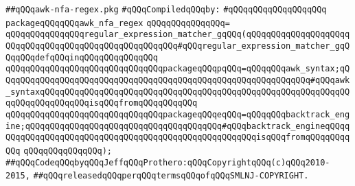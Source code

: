 \label{src/lib/regex/awk-nfa-regex.pkg}
\verb|##qQQqawk-nfa-regex.pkg|\newline
\newline
\verb|#qQQqCompiledqQQqby:|\newline
\verb|#qQQqqQQqqQQqqQQqqQQq|\newline
\newline
\verb|packageqQQqqQQqawk_nfa_regex|\newline
\verb|qQQqqQQqqQQqqQQq=|\newline
\verb|qQQqqQQqqQQqqQQqregular_expression_matcher_gqQQq(qQQqqQQqqQQqqQQqqQQqqQQqqQQqqQQqqQQqqQQqqQQqqQQqqQQqqQQq#qQQqregular_expression_matcher_gqQQqqQQqdefqQQqinqQQqqQQqqQQqqQQq|\newline
\verb|qQQqqQQqqQQqqQQqqQQqqQQqqQQqqQQqpackageqQQqpqQQq=qQQqqQQqawk_syntax;qQQqqQQqqQQqqQQqqQQqqQQqqQQqqQQqqQQqqQQqqQQqqQQqqQQqqQQqqQQqqQQq#qQQqawk_syntaxqQQqqQQqqQQqqQQqqQQqqQQqqQQqqQQqqQQqqQQqqQQqqQQqqQQqqQQqqQQqqQQqqQQqqQQqqQQqqQQqisqQQqfromqQQqqQQqqQQq|\newline
\verb|qQQqqQQqqQQqqQQqqQQqqQQqqQQqqQQqpackageqQQqeqQQq=qQQqqQQqbacktrack_engine;qQQqqQQqqQQqqQQqqQQqqQQqqQQqqQQqqQQqqQQq#qQQqbacktrack_engineqQQqqQQqqQQqqQQqqQQqqQQqqQQqqQQqqQQqqQQqqQQqqQQqqQQqqQQqisqQQqfromqQQqqQQqqQQq|\newline
\verb|qQQqqQQqqQQqqQQq);|\newline
\newline
\newline
\newline
\verb|##qQQqCodeqQQqbyqQQqJeffqQQqProthero:qQQqCopyrightqQQq(c)qQQq2010-2015,|\newline
\verb|##qQQqreleasedqQQqperqQQqtermsqQQqofqQQqSMLNJ-COPYRIGHT.|\newline

